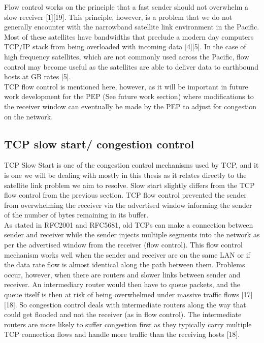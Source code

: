 \documentclass{uathesis}
\begin{document}
Flow control works on the principle that a fast sender should not overwhelm a slow receiver [1][19]. This principle, however, is a problem that we do not generally encounter with the narrowband satellite link environment in the Pacific. Most of these satellites have bandwidths that preclude a modern day computers TCP/IP stack from being overloaded with incoming data [4][5]. In the case of high frequency satellites, which are not commonly used across the Pacific, flow control may become useful as the satellites are able to deliver data to earthbound hosts at GB rates [5]. \\

TCP flow control is mentioned here, however, as it will be important in future work development for the PEP (See future work section) where modifications to the receiver window can eventually be made by the PEP to adjust for congestion on the network.

\subsection{TCP slow start/ congestion control}
TCP Slow Start is one of the congestion control mechanisms used by TCP, and it is one we will be dealing with mostly in this thesis as it relates directly to the satellite link problem we aim to resolve. Slow start slightly differs from the TCP flow control from the previous section. TCP flow control prevented the sender from overwhelming the receiver via the advertised window informing the sender of the number of bytes remaining in its buffer. \\

As stated in RFC2001 and RFC5681, old TCPs can make a connection between sender and receiver while the sender injects multiple segments into the network as per the advertised window from the receiver (flow control). This flow control mechanism works well when the sender and receiver are on the same LAN or if the data rate flow is almost identical along the path between them. Problems occur, however, when there are routers and slower links between sender and receiver. An intermediary router would then have to queue packets, and the queue itself is then at risk of being overwhelmed under massive traffic flows [17][18]. So congestion control deals with intermediate routers along the way that could get flooded and not the receiver (as in flow control). The intermediate routers are more likely to suffer congestion first as they typically carry multiple TCP connection flows and handle more traffic than the receiving hosts [18].\\
\end{document}
